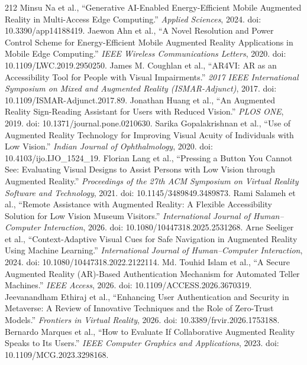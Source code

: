 \begin{thebibliography}{212}
 Minsu Na et al., ``Generative AI-Enabled Energy-Efficient Mobile Augmented Reality in Multi-Access Edge Computing.'' \emph{Applied Sciences}, 2024. doi: 10.3390/app14188419.
 Jaewon Ahn et al., ``A Novel Resolution and Power Control Scheme for Energy-Efficient Mobile Augmented Reality Applications in Mobile Edge Computing.'' \emph{IEEE Wireless Communications Letters}, 2020. doi: 10.1109/LWC.2019.2950250.
 James M. Coughlan et al., ``{AR4VI}: {AR} as an Accessibility Tool for People with Visual Impairments.'' \emph{2017 IEEE International Symposium on Mixed and Augmented Reality (ISMAR-Adjunct)}, 2017. doi: 10.1109/ISMAR-Adjunct.2017.89.
 Jonathan Huang et al., ``An Augmented Reality Sign-Reading Assistant for Users with Reduced Vision.'' \emph{PLOS ONE}, 2019. doi: 10.1371/journal.pone.0210630.
 Sarika Gopalakrishnan et al., ``Use of Augmented Reality Technology for Improving Visual Acuity of Individuals with Low Vision.'' \emph{Indian Journal of Ophthalmology}, 2020. doi: 10.4103/ijo.IJO_1524_19.
 Florian Lang et al., ``Pressing a Button You Cannot See: Evaluating Visual Designs to Assist Persons with Low Vision through Augmented Reality.'' \emph{Proceedings of the 27th ACM Symposium on Virtual Reality Software and Technology}, 2021. doi: 10.1145/3489849.3489873.
 Rami Salameh et al., ``Remote Assistance with Augmented Reality: A Flexible Accessibility Solution for Low Vision Museum Visitors.'' \emph{International Journal of Human--Computer Interaction}, 2026. doi: 10.1080/10447318.2025.2531268.
 Arne Seeliger et al., ``Context-Adaptive Visual Cues for Safe Navigation in Augmented Reality Using Machine Learning.'' \emph{International Journal of Human--Computer Interaction}, 2024. doi: 10.1080/10447318.2022.2122114.
 Md. Touhid Islam et al., ``A Secure Augmented Reality ({AR})-Based Authentication Mechanism for Automated Teller Machines.'' \emph{IEEE Access}, 2026. doi: 10.1109/ACCESS.2026.3670319.
 Jeevanandham Ethiraj et al., ``Enhancing User Authentication and Security in Metaverse: A Review of Innovative Techniques and the Role of Zero-Trust Models.'' \emph{Frontiers in Virtual Reality}, 2026. doi: 10.3389/frvir.2026.1753188.
 Bernardo Marques et al., ``How to Evaluate If Collaborative Augmented Reality Speaks to Its Users.'' \emph{IEEE Computer Graphics and Applications}, 2023. doi: 10.1109/MCG.2023.3298168.

\end{thebibliography}

